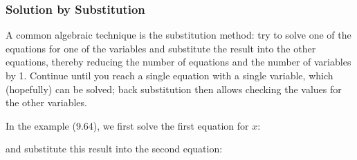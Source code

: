             \subsubsection{ Solution by Substitution}
            \nopagebreak
        \label{m39257*id159786}A common algebraic technique is the substitution method: try to solve one of the equations for one of the variables and substitute the result into the other equations, thereby reducing the number of equations and the number of variables by 1. Continue until you reach a single equation with a single variable, which (hopefully) can be solved; back substitution then allows checking the values for the other variables.\par 
        \label{m39257*id159793}In the example (9.64), we first solve the first equation for $x$:\par 
        \label{m39257*id159811}\nopagebreak\noindent{}
        \label{m39257*id159835}and substitute this result into the second equation:\par 
        \label{m39257*id159838}\nopagebreak\noindent{}
